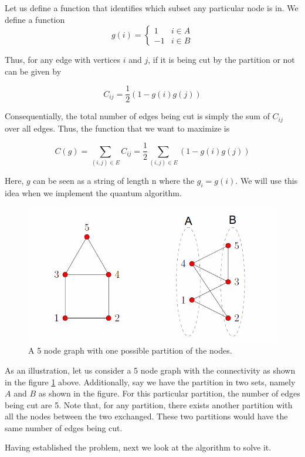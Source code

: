 Let us define a function that identifies which subset any particular node is in. We define a function
\begin{equation}
     g(i) = \begin{cases} 
         1 & i \in A \\
        -1 & i \in B 
   \end{cases}
   \label{g_def}
\end{equation}

Thus, for any edge with vertices $i$ and $j$, if it is being cut by the partition or not can be given by

\begin{equation}
    C_{ij} = \frac{1}{2}(1 - g(i)g(j))
    \label{C_def}
\end{equation}

Consequentially, the total number of edges being cut is simply the sum of $C_{ij}$ over all edges. Thus, the function that we want to maximize is

$$C(g) = \sum_{(i, j) \in E}C_{ij} = \frac{1}{2}\sum_{(i, j) \in E}(1 - g(i)g(j))$$

Here, $g$ can be seen as a string of length n where the $g_i = g(i)$.
We will use this idea when we implement the quantum algorithm.

\begin{figure}[h]
    \centering
    \includegraphics[scale=0.65]{images/GraphCut.png}
    \caption{A 5 node graph with one possible partition of the nodes.}
    \label{fig:GraphCut}
\end{figure}

As an illustration, let us consider a 5 node graph with the connectivity as shown in the figure \ref{fig:GraphCut} above.
Additionally, say we have the partition in two sets, namely $A$ and $B$ as shown in the figure.
For this particular partition, the number of edges being cut are 5.
Note that, for any partition, there exists another partition with all the nodes between the two exchanged.
These two partitions would have the same number of edges being cut.

Having established the problem, next we look at the algorithm to solve it.